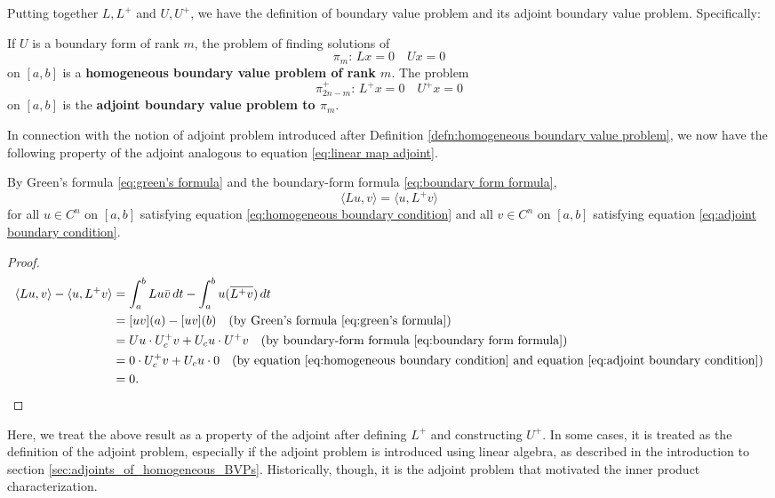 \documentclass[12pt, oneside, a4paper]{article}
\begin{document}
Putting together $L, L^+$ and $U, U^+$, we have the definition of boundary value problem and its adjoint boundary value problem. Specifically:

\begin{defn}\cite[p.291]{CoddingtonLevinson}\label{defn:adjoint boundary value problem}
    If $U$ is a boundary form of rank $m$, the problem of finding solutions of
    \[\pi_m:\,Lx=0\quad Ux=0\]
    on $[a,b]$ is a \textbf{homogeneous boundary value problem of rank $m$}. The problem
    \[\pi_{2n-m}^+:\,L^+x=0\quad U^+x=0\]
    on $[a,b]$ is the \textbf{adjoint boundary value problem to $\pi_m$}.
\end{defn}

In connection with the notion of adjoint problem introduced after Definition \ref{defn:homogeneous boundary value problem}, we now have the following property of the adjoint analogous to equation \eqref{eq:linear map adjoint}.

\begin{prop}\label{prop:(Lu,v)=(u,L^+v)}
    By Green's formula \eqref{eq:green's formula} and the boundary-form formula \eqref{eq:boundary form formula}, 
    \[\langle Lu, v\rangle = \langle u, L^+v\rangle\]
    for all $u\in C^n$ on $[a,b]$ satisfying equation \eqref{eq:homogeneous boundary condition} and all $v\in C^n$ on $[a,b]$ satisfying equation \eqref{eq:adjoint boundary condition}.
\end{prop}
\begin{proof}
    \begin{equation}
        \begin{split}
            \langle Lu, v\rangle - \langle u, L^+v\rangle &= \int_a^b Lu\bar{v}\,dt - \int_a^b u(\overline{L^+v})\,dt\\
            &= [uv](a) - [uv](b) \quad\mbox{(by Green's formula \eqref{eq:green's formula})}\\
            &= Uu\cdot U_c^+ v + U_c u\cdot U^+v \quad\mbox{(by boundary-form formula \eqref{eq:boundary form formula})}\\
            &= 0\cdot U_c^+ v + U_c u \cdot 0 \quad\mbox{(by equation \eqref{eq:homogeneous boundary condition} and equation \eqref{eq:adjoint boundary condition})}\\
            &= 0.\qedhere
        \end{split}
    \end{equation}
\end{proof}

Here, we treat the above result as a property of the adjoint after defining $L^+$ and constructing $U^+$. 
In some cases, it is treated as the definition of the adjoint problem, especially if the adjoint problem is introduced using linear algebra, as described in the introduction to section \ref{sec:adjoints_of_homogeneous_BVPs}. Historically, though, it is the adjoint problem that motivated the inner product characterization.
\end{document}
